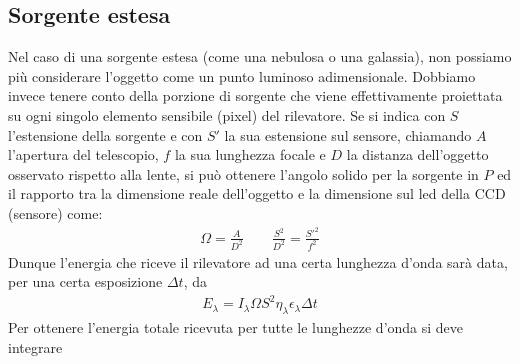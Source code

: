 \documentclass[a4paper, oneside]{book}
\begin{document}
\subsection{Sorgente estesa}
\begin{figure}
    \centering
\end{figure}
Nel caso di una sorgente estesa (come una nebulosa o una galassia), non possiamo più considerare l'oggetto
come un punto luminoso adimensionale. Dobbiamo invece tenere conto della porzione di sorgente che viene
effettivamente proiettata su ogni singolo elemento sensibile (pixel) del rilevatore.
Se si indica con $S$ l'estensione della sorgente e con $S'$ la sua estensione sul sensore,
chiamando $A$ l'apertura del telescopio, $f$ la sua lunghezza focale e $D$ la distanza dell'oggetto
osservato rispetto alla lente, si può ottenere l'angolo solido per la sorgente in $P$ ed il rapporto tra
la dimensione reale dell'oggetto e la dimensione sul led della CCD (sensore) come: 
\begin{gather*}
    \Omega = \frac{A}{D^{2} } \qquad \frac{S^{2} }{D^{2} } = \frac{S'^{2} }{f^{2} }
\end{gather*}
Dunque l'energia che riceve il rilevatore ad una certa lunghezza d'onda sarà data, per una certa esposizione $\Delta t$, da
\begin{gather*}
    E_\lambda = I_\lambda \Omega S^{2}\eta_\lambda \epsilon_\lambda \Delta t 
\end{gather*}
Per ottenere l'energia totale ricevuta per tutte le lunghezze d'onda si deve integrare 
\end{document}

